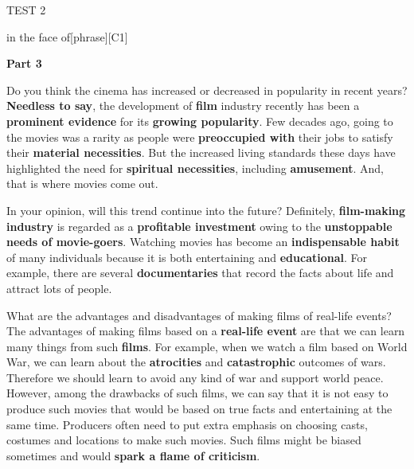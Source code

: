 \begin{glossarymc}[Cambridge 3]
\begin{test}{TEST 2}
\begin{VocabExplain}[Part 2]
\begin{ExplainCard}{in the face of}[phrase][C1]
\end{ExplainCard}

\end{VocabExplain}
\noindent
\textbf{Part 3}

\begin{qa}{Do you think the cinema has increased or decreased in popularity in recent years?}
\textbf{Needless to say}, the development of \textbf{film} industry recently has been a \textbf{prominent evidence} for its \textbf{growing popularity}. Few decades ago, going to the movies was a rarity as people were \textbf{preoccupied with} their jobs to satisfy their \textbf{material necessities}. But the increased living standards these days have highlighted the need for \textbf{spiritual necessities}, including \textbf{amusement}. And, that is where movies come out.
\end{qa}

\begin{qa}{In your opinion, will this trend continue into the future?}
Definitely, \textbf{film-making industry} is regarded as a \textbf{profitable investment} owing to the \textbf{unstoppable needs of movie-goers}. Watching movies has become an \textbf{indispensable habit} of many individuals because it is both entertaining and \textbf{educational}. For example, there are several \textbf{documentaries} that record the facts about life and attract lots of people.
\end{qa}

\begin{qa}{What are the advantages and disadvantages of making films of real-life events?}
The advantages of making films based on a \textbf{real-life event} are that we can learn many things from such \textbf{films}. For example, when we watch a film based on World War, we can learn about the \textbf{atrocities} and \textbf{catastrophic} outcomes of wars. Therefore we should learn to avoid any kind of war and support world peace. However, among the drawbacks of such films, we can say that it is not easy to produce such movies that would be based on true facts and entertaining at the same time. Producers often need to put extra emphasis on choosing casts, costumes and locations to make such movies. Such films might be biased sometimes and would \textbf{spark a flame of criticism}.
\end{qa}


\end{test}
\end{glossarymc}
